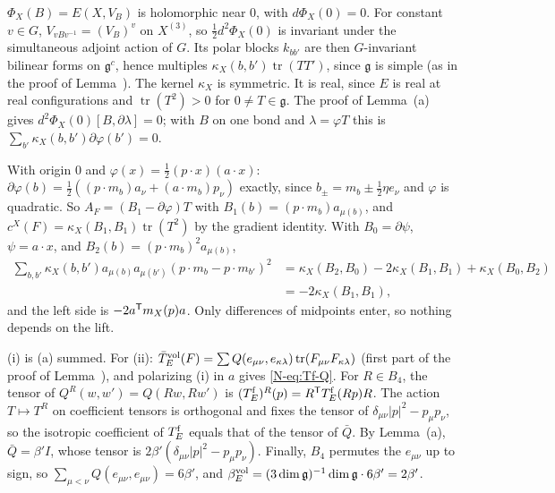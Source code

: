 \begin{step}[(a)]
$\Phi_X(B)=E(X,V_B)$ is holomorphic near $0$, with $d\Phi_X(0)=0$. For constant $v\in G$, $V_{vBv^{-1}}=(V_B)^v$ on $X^{(3)}$, so $\frac12d^2\Phi_X(0)$ is invariant under the simultaneous adjoint action of $G$. Its polar blocks $k_{bb'}$ are then $G$-invariant bilinear forms on $\mathfrak g^c$, hence multiples $\kappa_X(b,b')\operatorname{tr}(TT')$, since $\mathfrak g$ is simple (as in the proof of Lemma~). The kernel $\kappa_X$ is symmetric. It is real, since $E$ is real at real configurations and $\operatorname{tr}(T^2)>0$ for $0\ne T\in\mathfrak g$. The proof of Lemma~(a) gives $d^2\Phi_X(0)[B,\partial\lambda]=0$; with $B$ on one bond and $\lambda=\varphi T$ this is $\sum_{b'}\kappa_X(b,b')\partial\varphi(b')=0$.

With origin $0$ and $\varphi(x)=\frac12(p\cdot x)(a\cdot x)$: $\partial\varphi(b)=\frac12((p\cdot m_b)a_\nu+(a\cdot m_b)p_\nu)$ exactly, since $b_\pm=m_b\pm\frac12\eta e_\nu$ and $\varphi$ is quadratic. So $A_F=(B_1-\partial\varphi)T$ with $B_1(b)=(p\cdot m_b)a_{\mu(b)}$, and $c^X(F)=\kappa_X(B_1,B_1)\operatorname{tr}(T^2)$ by the gradient identity. With $B_0=\partial\psi$, $\psi=a\cdot x$, and $B_2(b)=(p\cdot m_b)^2a_{\mu(b)}$,
\[
\begin{aligned}
\sum_{b,b'}\kappa_X(b,b')a_{\mu(b)}a_{\mu(b')}(p\cdot m_b-p\cdot m_{b'})^2&=\kappa_X(B_2,B_0)-2\kappa_X(B_1,B_1)+\kappa_X(B_0,B_2)\\
&=-2\kappa_X(B_1,B_1),
\end{aligned}
\]
and the left side is $-2a^{\sf T}m_X(p)a$. Only differences of midpoints enter, so nothing depends on the lift.
\end{step}

\begin{step}[(b)]
(i) is (a) summed. For (ii): $\bar T^{\rm vol}_E(F)=\sum Q(e_{\mu\nu},e_{\kappa\lambda})\operatorname{tr}(F_{\mu\nu}F_{\kappa\lambda})$ (first part of the proof of Lemma~), and polarizing (i) in $a$ gives \eqref{N-eq:Tf-Q}. For $R\in B_4$, the tensor of $Q^R(w,w')=Q(Rw,Rw')$ is $(T^{\rm f}_E)^R(p)=R^{\sf T}T^{\rm f}_E(Rp)R$. The action $T\mapsto T^R$ on coefficient tensors is orthogonal and fixes the tensor of $\delta_{\mu\nu}|p|^2-p_\mu p_\nu$, so the isotropic coefficient of $T^{\rm f}_E$ equals that of the tensor of $\bar Q$. By Lemma~(a), $\bar Q=\beta'I$, whose tensor is $2\beta'(\delta_{\mu\nu}|p|^2-p_\mu p_\nu)$. Finally, $B_4$ permutes the $e_{\mu\nu}$ up to sign, so $\sum_{\mu<\nu}Q(e_{\mu\nu},e_{\mu\nu})=6\beta'$, and $\beta^{\rm vol}_E=(3\dim\mathfrak g)^{-1}\dim\mathfrak g\cdot6\beta'=2\beta'$.
\end{step}


